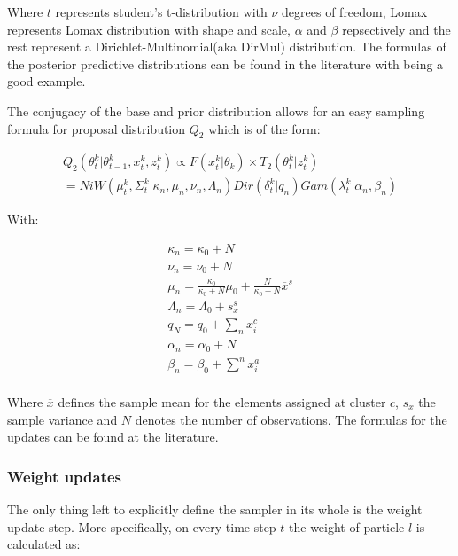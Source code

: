 \documentclass[twoside,hidelinks]{article}
\begin{document}
Where $t$ represents student's t-distribution with $\nu$ degrees of freedom, Lomax represents Lomax distribution with shape and scale, $\alpha$ and $\beta$ repsectively and the rest represent a Dirichlet-Multinomial(aka DirMul) distribution. The formulas of the posterior predictive distributions can be found in the literature with \cite{compendium} being a good example. 

The conjugacy of the base and prior distribution allows for an easy sampling formula for proposal distribution $Q_2$ which is of the form: 


\begin{equation} \label{Q_2}
\begin{split}
Q_2(\theta_t^k | \theta_{t-1}^k , x_t^k, z_t^k) \propto F( x_t^k | \theta_k) \times T_2(\theta_t^k | z_t^k) \\
= NiW( \mu_t^k, \Sigma_t^k | \kappa_n, \mu_n, \nu_n, \Lambda_n ) Dir(\delta_t^k | q_n) Gam(\lambda_t^k | \alpha_n, \beta_n)
\end{split}
\end{equation}

With:

\begin{equation} \label{udpates}
\begin{split}
\kappa_n = \kappa_0 + N \\
\nu_n = \nu_0 + N \\
\mu_n = \frac{\kappa_0}{\kappa_0 + N} \mu_0 +  \frac{N}{\kappa_0 + N} \overline{x}^s\\
\Lambda_n = \Lambda_0 + s_{x}^s\\
q_N = q_0 +  \sum_n x_i^c\\
\alpha_n = \alpha_0 +  N\\
\beta_n = \beta_0 +  \sum^n x_i^a\\
\end{split}
\end{equation}


Where $\overline{x}$ defines the sample mean for the elements assigned at cluster $c$, $s_{x}$ the sample variance and $N$ denotes the number of observations. The formulas for the updates can be found at the literature.

\subsubsection{Weight updates}

The only thing left to explicitly define the sampler in its whole is the weight update step. More specifically, on every time step $t$ the weight of particle $l$ is calculated as:
\end{document}

